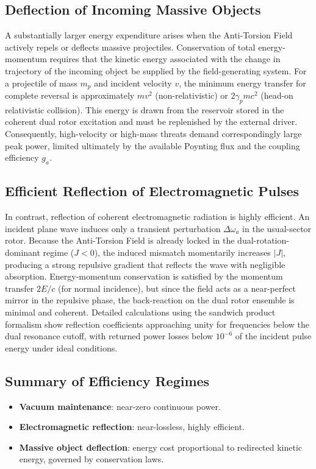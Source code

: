 \documentclass[dvipdfmx,11pt,a4paper]{article}
\theoremstyle{definition}
\begin{document}
\subsection{Deflection of Incoming Massive Objects}
A substantially larger energy expenditure arises when the Anti-Torsion Field actively repels or deflects massive projectiles. Conservation of total energy-momentum requires that the kinetic energy associated with the change in trajectory of the incoming object be supplied by the field-generating system. For a projectile of mass $m_p$ and incident velocity $v$, the minimum energy transfer for complete reversal is approximately $mv^2$ (non-relativistic) or $2\gamma_p mc^2$ (head-on relativistic collision). This energy is drawn from the reservoir stored in the coherent dual rotor excitation and must be replenished by the external driver. Consequently, high-velocity or high-mass threats demand correspondingly large peak power, limited ultimately by the available Poynting flux and the coupling efficiency $g_a$.

\subsection{Efficient Reflection of Electromagnetic Pulses}
In contrast, reflection of coherent electromagnetic radiation is highly efficient. An incident plane wave induces only a transient perturbation $\Delta\omega_a$ in the usual-sector rotor. Because the Anti-Torsion Field is already locked in the dual-rotation-dominant regime ($J < 0$), the induced mismatch momentarily increases $|J|$, producing a strong repulsive gradient that reflects the wave with negligible absorption. Energy-momentum conservation is satisfied by the momentum transfer $2E/c$ (for normal incidence), but since the field acts as a near-perfect mirror in the repulsive phase, the back-reaction on the dual rotor ensemble is minimal and coherent. Detailed calculations using the sandwich product formalism show reflection coefficients approaching unity for frequencies below the dual resonance cutoff, with returned power losses below $10^{-6}$ of the incident pulse energy under ideal conditions.

\subsection{Summary of Efficiency Regimes}
\begin{itemize}
  \item \textbf{Vacuum maintenance}: near-zero continuous power.
  \item \textbf{Electromagnetic reflection}: near-lossless, highly efficient.
  \item \textbf{Massive object deflection}: energy cost proportional to redirected kinetic energy, governed by conservation laws.
\end{itemize}
\end{document}
